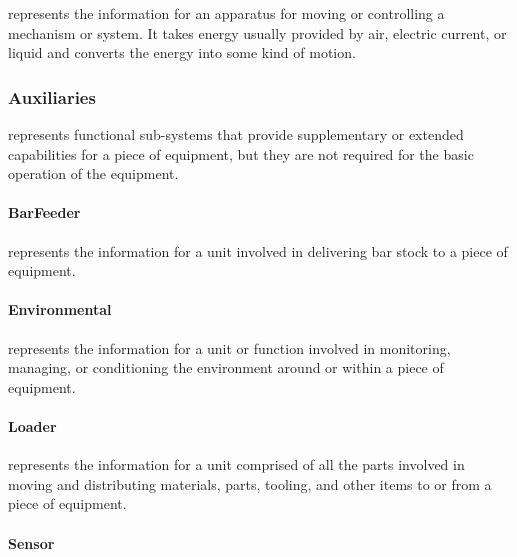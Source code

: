  represents the information for an apparatus for moving or controlling a mechanism or system. It takes energy usually provided by air, electric current, or liquid and converts the energy into some kind of motion.

\FloatBarrier

\subsubsection{Auxiliaries}
\label{sec:Auxiliaries}



 represents functional sub-systems that provide supplementary or extended capabilities for a piece of equipment, but they are not required for the basic operation of the equipment.

\FloatBarrier

\paragraph{BarFeeder}\mbox{}
\label{sec:BarFeeder}



 represents the information for a unit involved in delivering bar stock to a piece of equipment.


\paragraph{Environmental}\mbox{}
\label{sec:Environmental}



 represents the information for a unit or function involved in monitoring, managing, or conditioning the environment around or within a piece of equipment.


\paragraph{Loader}\mbox{}
\label{sec:Loader}



 represents the information for a unit comprised of all the parts involved in moving and distributing materials, parts, tooling, and other items to or from a piece of equipment.


\paragraph{Sensor}\mbox{}
\label{sec:Sensor}



